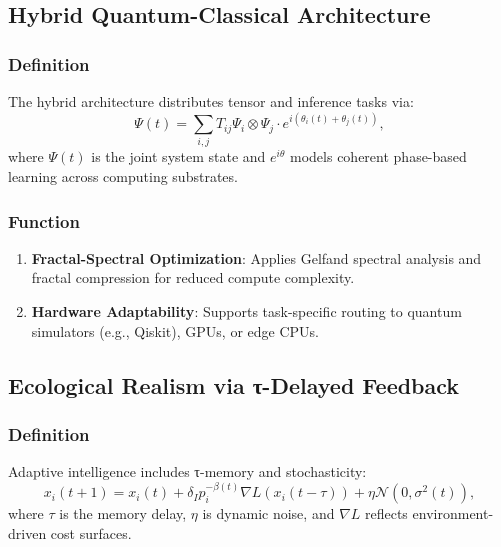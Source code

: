 \documentclass{article}
\theoremstyle{plain}
\theoremstyle{claimstyle}
\begin{document}
\subsection{Hybrid Quantum-Classical Architecture}

\subsubsection{Definition}

The hybrid architecture distributes tensor and inference tasks via:
\begin{equation}
\Psi(t) = \sum_{i,j} T_{ij} \Psi_i \otimes \Psi_j \cdot e^{i(\theta_i(t) + \theta_j(t))},
\end{equation}
where $\Psi(t)$ is the joint system state and $e^{i\theta}$ models coherent phase-based learning across computing substrates.

\subsubsection{Function}

\begin{enumerate}
    \item \textbf{Fractal-Spectral Optimization}: Applies Gelfand spectral analysis and fractal compression for reduced compute complexity.
    
    \item \textbf{Hardware Adaptability}: Supports task-specific routing to quantum simulators (e.g., Qiskit), GPUs, or edge CPUs.
\end{enumerate}

\subsection{Ecological Realism via τ-Delayed Feedback}

\subsubsection{Definition}

Adaptive intelligence includes τ-memory and stochasticity:
\begin{equation}
x_i(t+1) = x_i(t) + \delta_I p_i^{-\beta(t)} \nabla L(x_i(t - \tau)) + \eta \mathcal{N}(0, \sigma^2(t)),
\end{equation}
where $\tau$ is the memory delay, $\eta$ is dynamic noise, and $\nabla L$ reflects environment-driven cost surfaces.
\end{document}
